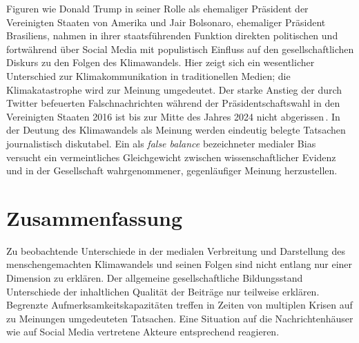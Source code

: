 Figuren wie Donald Trump in seiner Rolle als ehemaliger Präsident der Vereinigten Staaten von Amerika und Jair Bolsonaro, ehemaliger Präsident Brasiliens, nahmen in ihrer staatsführenden Funktion direkten politischen und fortwährend über Social Media mit populistisch Einfluss auf den gesellschaftlichen Diskurs zu den Folgen des Klimawandels.
Hier zeigt sich ein wesentlicher Unterschied zur Klimakommunikation in traditionellen Medien; die Klimakatastrophe wird zur Meinung umgedeutet.
Der starke Anstieg der durch Twitter befeuerten Falschnachrichten während der Präsidentschaftswahl in den Vereinigten Staaten 2016 ist bis zur Mitte des Jahres 2024 nicht abgerissen\,\cite{Article.Bovet.InfluenceOfFakeNewsInTwitterDuringThe2016USPresidentialElection.2019}.
In der Deutung des Klimawandels als Meinung werden eindeutig belegte Tatsachen journalistisch diskutabel.
Ein als \textit{false balance} bezeichneter medialer Bias\,\cite{Article.Imundo.WhenFairnessIsFlawedEffectsOfFalseBalanceReportingAndWeightOfEvidenceStatementsOnBeliefsAndPerceptionsOfClimateChange.2022} versucht ein vermeintliches Gleichgewicht zwischen wissenschaftlicher Evidenz und in der Gesellschaft wahrgenommener, gegenläufiger Meinung herzustellen.

\section{Zusammenfassung}

Zu beobachtende Unterschiede in der medialen Verbreitung und Darstellung des menschengemachten Klimawandels und seinen Folgen sind nicht entlang nur einer Dimension zu erklären.
Der allgemeine gesellschaftliche Bildungsstand Unterschiede der inhaltlichen Qualität der Beiträge nur teilweise erklären.
Begrenzte Aufmerksamkeitskapazitäten treffen in Zeiten von multiplen Krisen auf zu Meinungen umgedeuteten Tatsachen.
Eine Situation auf die Nachrichtenhäuser wie auf Social Media vertretene Akteure entsprechend reagieren.